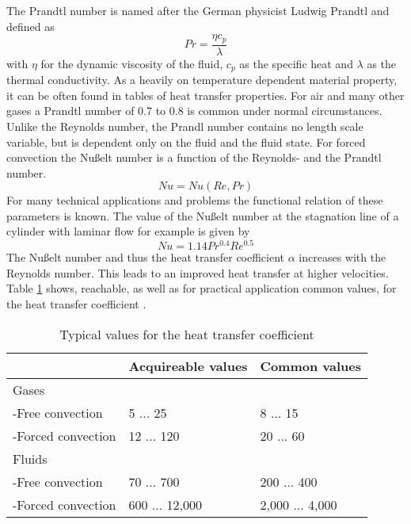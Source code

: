 The Prandtl number is named after the German physicist Ludwig Prandtl and defined as
\begin{equation}
Pr = \frac{\eta c_p}{\lambda}
\end{equation}
with $\eta$ for the dynamic viscosity of the fluid, $c_p$ as the specific heat and $\lambda$ as the thermal conductivity. As a heavily on temperature dependent material property, it can be often found in tables of heat transfer properties. For air and many other gases a Prandtl number of 0.7 to 0.8 is common under normal circumstances. Unlike the Reynolds number, the Prandl number contains no length scale variable, but is dependent only on the fluid and the fluid state.
For forced convection the Nußelt number is a function of the Reynolds- and the Prandtl number.
\begin{equation}
Nu = Nu( Re, Pr )
\end{equation}
For many technical applications and problems the functional relation of these parameters is known. The value of the Nußelt number at the stagnation line of a cylinder with laminar flow for example is given by
\begin{equation}
\label{eq:Nu2}
Nu = 1.14Pr^{0.4} Re^{0.5} 
\end{equation}
The Nußelt number and thus the heat transfer coefficient $\alpha$ increases with the Reynolds number. This leads to an improved heat transfer at higher velocities. 
Table \ref{fig:htc_values} shows, reachable, as well as for practical application common values, for the heat transfer coefficient \cite{cerbe}.
\begin{table}[ht]
\centering
\caption{\cite[p.374]{cerbe} Typical values for the heat transfer coefficient}
\label{fig:htc_values}
\begin{tabular}{lll}
&Acquireable values&Common values\\
\hline
Gases&&\\
-Free convection&5 ... 25&8 ... 15\\
-Forced convection&12 ... 120&20 ... 60\\
Fluids&&\\
-Free convection&70 ... 700&200 ... 400\\
-Forced convection&600 ... 12,000&2,000 ... 4,000\\
\end{tabular}
\end{table}







